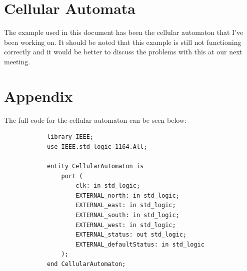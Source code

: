 \documentclass{article}
\begin{document}
	\section{Cellular Automata}
		The example used in this document has been the cellular automaton that I've been working on. It should be noted that this example is still not functioning correctly and it would be better to discuss the problems with this at our next meeting.
	\pagebreak
	\section{Appendix}
		The full code for the cellular automaton can be seen below:
		\begin{lstlisting}
			library IEEE;
			use IEEE.std_logic_1164.All;
			
			entity CellularAutomaton is
				port (
					clk: in std_logic;
					EXTERNAL_north: in std_logic;
					EXTERNAL_east: in std_logic;
					EXTERNAL_south: in std_logic;
					EXTERNAL_west: in std_logic;
					EXTERNAL_status: out std_logic;
					EXTERNAL_defaultStatus: in std_logic
				);
			end CellularAutomaton;
			

\end{lstlisting}
\end{document}
